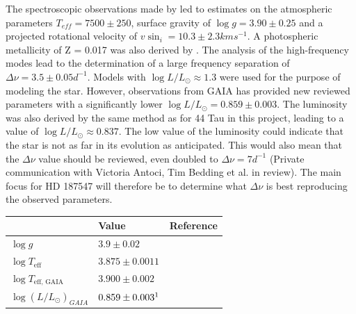 The spectroscopic observations made by \citet{antoci2011excitation} led to estimates on the atmospheric parameters $T_{eff} = 7500 \pm 250$, surface gravity of $\log g = 3.90 \pm 0.25$ and a projected rotational velocity of $v \sin_i = 10.3 \pm 2.3 kms^{-1}$. A photospheric metallicity of Z = 0.017 was also derived by \citet{antoci2011excitation}. The analysis of the high-frequency modes lead to the determination of a large frequency separation of $\Delta \nu = 3.5 \pm 0.05 d^{-1}$. Models with $\log L/L_\odot \approx 1.3$ were used for the purpose of modeling the star. However, observations from GAIA has provided new reviewed parameters with a significantly lower $ \log L/L_\odot = 0.859 \pm 0.003$. The luminosity was also derived by the same method as for 44 Tau in this project, leading to a value of $\log L/L_\odot \approx 0.837$. The low value of the luminosity could indicate that the star is not as far in its evolution as \citet{antoci2011excitation, antoci2014role} anticipated. This would also mean that the $\Delta \nu $ value should be reviewed, even doubled to $\Delta \nu = 7 d^{-1}$ (Private communication with Victoria Antoci, Tim Bedding et al. in review). The main focus for HD 187547 will therefore be to determine what $\Delta \nu$ is best reproducing the observed parameters. 


\begin{table}[htbp]
	\centering
	\begin{tabular}{|l|ll|}
		\hline
		& Value                                             & Reference \\ \hline
		$\log g$                                  &  $3.9 \pm 0.02$                            & \citep{antoci2011excitation}    \\
		$\log T_\text{eff}$             & $3.875  \pm 0.0011$                   &   \citep{antoci2011excitation}   \\
		$\log T_\text{eff, GAIA}$ &  $3.900 \pm 0.002$                  & \citep{brown2018gaia} \\
		$\log (L/L_\odot)_{GAIA}$& $0.859 \pm 0.003\footnotemark{}$                   &  \citep{brown2018gaia}   \\ \hline
	\end{tabular}
\end{table}


